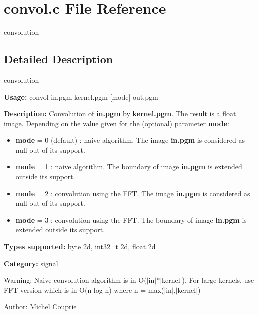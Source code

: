\section{convol.c File Reference}
\label{convol_8c}
convolution 



\subsection{Detailed Description}
convolution 

{\bf Usage:} convol in.pgm kernel.pgm [mode] out.pgm

{\bf Description:} Convolution of {\bf in.pgm} by {\bf kernel.pgm}. The result is a float image. Depending on the value given for the (optional) parameter {\bf mode}: \begin{itemize}
\item {\bf mode} = 0 (default) : naive algorithm. The image {\bf in.pgm} is considered as null out of its support. \item {\bf mode} = 1 : naive algorithm. The boundary of image {\bf in.pgm} is extended outside its support. \item {\bf mode} = 2 : convolution using the FFT. The image {\bf in.pgm} is considered as null out of its support. \item {\bf mode} = 3 : convolution using the FFT. The boundary of image {\bf in.pgm} is extended outside its support.\end{itemize}
{\bf Types supported:} byte 2d, int32\_\-t 2d, float 2d

{\bf Category:} signal

\begin{Desc}
\item[Warning:]Naive convolution algorithm is in O($|$in$|$$\ast$$|$kernel$|$). For large kernels, use FFT version which is in O(n log n) where n = max($|$in$|$,$|$kernel$|$)\end{Desc}
\begin{Desc}
\item[Author:]Michel Couprie \end{Desc}
